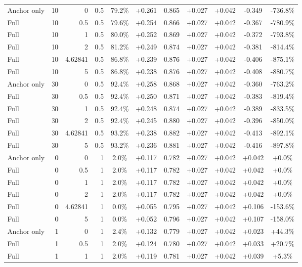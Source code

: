 \begin{table}[htbp]
\begin{tabular}{lrrrccccccc}
Anchor only & 10 & 0 & 0.5 & 79.2\% & +0.261 & 0.865 & +0.027 & +0.042 & -0.349 & -736.8\% \\
Full & 10 & 0.5 & 0.5 & 79.6\% & +0.254 & 0.866 & +0.027 & +0.042 & -0.367 & -780.9\% \\
Full & 10 & 1 & 0.5 & 80.0\% & +0.252 & 0.869 & +0.027 & +0.042 & -0.372 & -793.8\% \\
Full & 10 & 2 & 0.5 & 81.2\% & +0.249 & 0.874 & +0.027 & +0.042 & -0.381 & -814.4\% \\
Full & 10 & 4.62841 & 0.5 & 86.8\% & +0.239 & 0.876 & +0.027 & +0.042 & -0.406 & -875.1\% \\
Full & 10 & 5 & 0.5 & 86.8\% & +0.238 & 0.876 & +0.027 & +0.042 & -0.408 & -880.7\% \\
Anchor only & 30 & 0 & 0.5 & 92.4\% & +0.258 & 0.868 & +0.027 & +0.042 & -0.360 & -763.2\% \\
Full & 30 & 0.5 & 0.5 & 92.4\% & +0.250 & 0.871 & +0.027 & +0.042 & -0.383 & -819.4\% \\
Full & 30 & 1 & 0.5 & 92.4\% & +0.248 & 0.874 & +0.027 & +0.042 & -0.389 & -833.5\% \\
Full & 30 & 2 & 0.5 & 92.4\% & +0.245 & 0.880 & +0.027 & +0.042 & -0.396 & -850.0\% \\
Full & 30 & 4.62841 & 0.5 & 93.2\% & +0.238 & 0.882 & +0.027 & +0.042 & -0.413 & -892.1\% \\
Full & 30 & 5 & 0.5 & 93.2\% & +0.236 & 0.881 & +0.027 & +0.042 & -0.416 & -897.8\% \\
Anchor only & 0 & 0 & 1 & 2.0\% & +0.117 & 0.782 & +0.027 & +0.042 & +0.042 & +0.0\% \\
Full & 0 & 0.5 & 1 & 2.0\% & +0.117 & 0.782 & +0.027 & +0.042 & +0.042 & +0.0\% \\
Full & 0 & 1 & 1 & 2.0\% & +0.117 & 0.782 & +0.027 & +0.042 & +0.042 & +0.0\% \\
Full & 0 & 2 & 1 & 2.0\% & +0.117 & 0.782 & +0.027 & +0.042 & +0.042 & +0.0\% \\
Full & 0 & 4.62841 & 1 & 0.0\% & +0.055 & 0.795 & +0.027 & +0.042 & +0.106 & -153.6\% \\
Full & 0 & 5 & 1 & 0.0\% & +0.052 & 0.796 & +0.027 & +0.042 & +0.107 & -158.0\% \\
Anchor only & 1 & 0 & 1 & 2.4\% & +0.132 & 0.779 & +0.027 & +0.042 & +0.023 & +44.3\% \\
Full & 1 & 0.5 & 1 & 2.0\% & +0.124 & 0.780 & +0.027 & +0.042 & +0.033 & +20.7\% \\
Full & 1 & 1 & 1 & 2.0\% & +0.119 & 0.781 & +0.027 & +0.042 & +0.039 & +5.3\% \\

\end{tabular}
\end{table}
